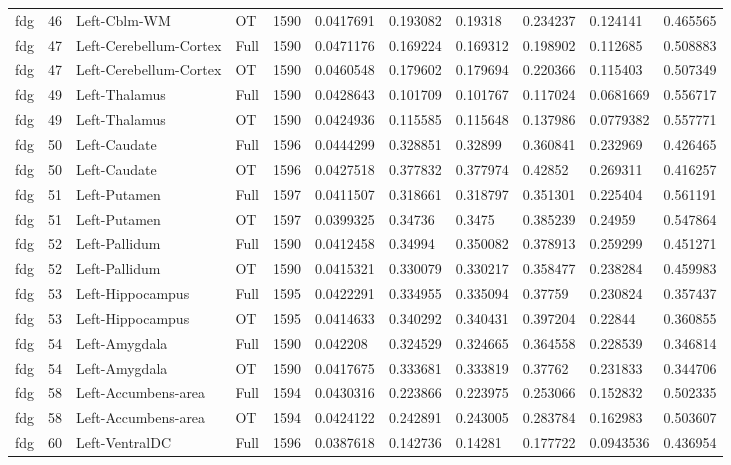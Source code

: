 \begin{landscape}
\begin{longtable}{lllllllllll}
fdg & 46 & Left-Cblm-WM & OT & 1590 & 0.0417691 & 0.193082 & 0.19318 & 0.234237 & 0.124141 & 0.465565 \\
fdg & 47 & Left-Cerebellum-Cortex & Full & 1590 & 0.0471176 & 0.169224 & 0.169312 & 0.198902 & 0.112685 & 0.508883 \\
fdg & 47 & Left-Cerebellum-Cortex & OT & 1590 & 0.0460548 & 0.179602 & 0.179694 & 0.220366 & 0.115403 & 0.507349 \\
fdg & 49 & Left-Thalamus & Full & 1590 & 0.0428643 & 0.101709 & 0.101767 & 0.117024 & 0.0681669 & 0.556717 \\
fdg & 49 & Left-Thalamus & OT & 1590 & 0.0424936 & 0.115585 & 0.115648 & 0.137986 & 0.0779382 & 0.557771 \\
fdg & 50 & Left-Caudate & Full & 1596 & 0.0444299 & 0.328851 & 0.32899 & 0.360841 & 0.232969 & 0.426465 \\
fdg & 50 & Left-Caudate & OT & 1596 & 0.0427518 & 0.377832 & 0.377974 & 0.42852 & 0.269311 & 0.416257 \\
fdg & 51 & Left-Putamen & Full & 1597 & 0.0411507 & 0.318661 & 0.318797 & 0.351301 & 0.225404 & 0.561191 \\
fdg & 51 & Left-Putamen & OT & 1597 & 0.0399325 & 0.34736 & 0.3475 & 0.385239 & 0.24959 & 0.547864 \\
fdg & 52 & Left-Pallidum & Full & 1590 & 0.0412458 & 0.34994 & 0.350082 & 0.378913 & 0.259299 & 0.451271 \\
fdg & 52 & Left-Pallidum & OT & 1590 & 0.0415321 & 0.330079 & 0.330217 & 0.358477 & 0.238284 & 0.459983 \\
fdg & 53 & Left-Hippocampus & Full & 1595 & 0.0422291 & 0.334955 & 0.335094 & 0.37759 & 0.230824 & 0.357437 \\
fdg & 53 & Left-Hippocampus & OT & 1595 & 0.0414633 & 0.340292 & 0.340431 & 0.397204 & 0.22844 & 0.360855 \\
fdg & 54 & Left-Amygdala & Full & 1590 & 0.042208 & 0.324529 & 0.324665 & 0.364558 & 0.228539 & 0.346814 \\
fdg & 54 & Left-Amygdala & OT & 1590 & 0.0417675 & 0.333681 & 0.333819 & 0.37762 & 0.231833 & 0.344706 \\
fdg & 58 & Left-Accumbens-area & Full & 1594 & 0.0430316 & 0.223866 & 0.223975 & 0.253066 & 0.152832 & 0.502335 \\
fdg & 58 & Left-Accumbens-area & OT & 1594 & 0.0424122 & 0.242891 & 0.243005 & 0.283784 & 0.162983 & 0.503607 \\
fdg & 60 & Left-VentralDC & Full & 1596 & 0.0387618 & 0.142736 & 0.14281 & 0.177722 & 0.0943536 & 0.436954 \\

\end{longtable}
\end{landscape}
